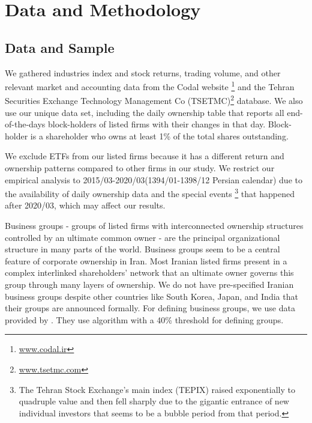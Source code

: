 \documentclass[12pt, a4paper]{article}
\begin{document}
\section{Data and Methodology}



\subsection{Data and Sample}


We gathered industries index and stock returns, trading volume, and other relevant market and accounting data from the Codal website \footnote{\href{http://www.codal.ir}{www.codal.ir}}
 and the  Tehran Securities Exchange Technology Management Co (TSETMC)\footnote{\href{http://www.tsetmc.com}{www.tsetmc.com}} database.
We also use our unique data set, including the daily ownership table that reports all end-of-the-days block-holders of listed firms with their changes in that day.  Block-holder is a shareholder who owns at least 1\% of the total shares outstanding. 

  We exclude ETFs from our listed firms because it has a different return and ownership patterns compared to other firms in our study.
We restrict our empirical analysis to 2015/03-2020/03(1394/01-1398/12 Persian calendar) due to the availability of daily ownership data and the special events \footnote{
The Tehran Stock Exchange's main index (TEPIX) raised exponentially to quadruple value and then fell sharply due to the gigantic entrance of new individual investors that seems to be a bubble period from that period.} that happened after 2020/03, which may affect our results. 
  
  
  
  Business groups - groups of listed firms with interconnected ownership structures controlled by an ultimate common owner - are the principal organizational structure in many parts of the world.
  Business groups seem to be a central feature of corporate ownership in Iran. 
  Most Iranian listed firms present in a complex interlinked shareholders' network that an ultimate owner governs this group through many layers of ownership.{\cite{Aliabadi2022}}  
We do not have pre-specified Iranian business groups despite other countries like South Korea, Japan, and India that their groups are announced formally.
For defining business groups, we use data provided by {\cite{Aliabadi2022}}.
They use \cite{almeida2011structure} algorithm with a 40\% threshold for defining groups. 
\end{document}
